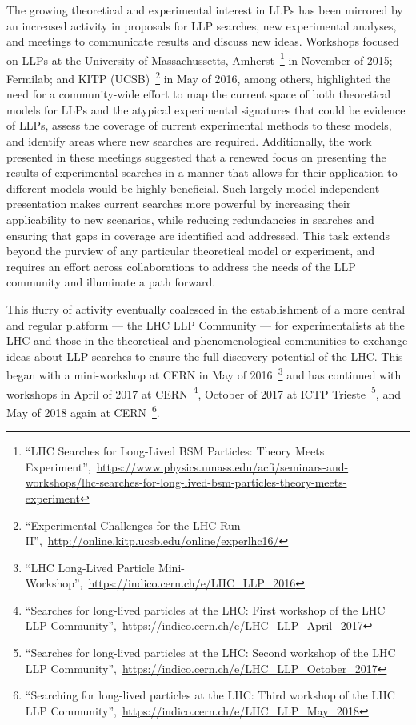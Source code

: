The growing theoretical and experimental interest in LLPs has been mirrored by an increased activity in proposals for LLP searches, new experimental analyses, and meetings to communicate results and discuss new ideas.
Workshops focused on LLPs at the University of Massachussetts, Amherst~\footnote{``LHC Searches for Long-Lived BSM Particles: Theory Meets Experiment'',~\url{https://www.physics.umass.edu/acfi/seminars-and-workshops/lhc-searches-for-long-lived-bsm-particles-theory-meets-experiment}} in November of 2015; Fermilab; and KITP (UCSB)~\footnote{``Experimental Challenges for the LHC Run II'',~\url{http://online.kitp.ucsb.edu/online/experlhc16/}} in May of 2016, among others, highlighted the need for a community-wide effort to map the current space of both theoretical models for LLPs and the atypical experimental signatures that could be evidence of LLPs, assess the coverage of current experimental methods to these models, and identify areas where new searches are required.
Additionally, the work presented in these meetings suggested that a renewed focus on presenting the results of experimental searches in a manner that allows for their application to different models would be highly beneficial.
Such largely model-independent presentation makes current searches more powerful by increasing their applicability to new scenarios, while reducing redundancies in searches and ensuring that gaps in coverage are identified and addressed.
This task extends beyond the purview of any particular theoretical model or experiment, and requires an effort across collaborations to address the needs of the LLP community and illuminate a path forward.

This flurry of activity eventually coalesced in the establishment of a more central and regular platform --- the LHC LLP Community --- for experimentalists at the LHC and those in the theoretical and phenomenological communities to exchange ideas about LLP searches to ensure the full discovery potential of the LHC.
This began with a mini-workshop at CERN in May of 2016~\footnote{``LHC Long-Lived Particle Mini-Workshop'',~\url{https://indico.cern.ch/e/LHC_LLP_2016}} and has continued with workshops in April of 2017 at CERN~\footnote{``Searches for long-lived particles at the LHC: First workshop of the LHC LLP Community'',~\url{https://indico.cern.ch/e/LHC_LLP_April_2017}}, October of 2017 at ICTP Trieste~\footnote{``Searches for long-lived particles at the LHC: Second workshop of the LHC LLP Community'',~\url{https://indico.cern.ch/e/LHC_LLP_October_2017}}, and May of 2018 again at CERN~\footnote{``Searching for long-lived particles at the LHC: Third workshop of the LHC LLP Community'',~\url{https://indico.cern.ch/e/LHC_LLP_May_2018}}.

